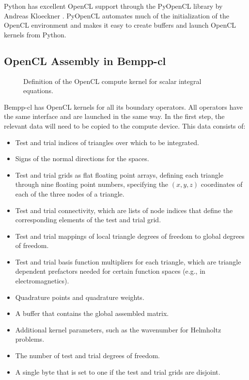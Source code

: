 Python has excellent OpenCL support through the PyOpenCL library by Andreas Kloeckner \cite{pyopencl}. PyOpenCL automates much of the initialization of the OpenCL environment and makes it easy to create buffers and launch OpenCL kernels from Python.

\subsection{OpenCL Assembly in Bempp-cl}

\begin{figure*}
	\center
	
	\caption{Definition of the OpenCL compute kernel for scalar integral equations.}
	\label{fig:kernel_definition}
\end{figure*}

Bempp-cl has OpenCL kernels for all its boundary operators. All operators have the same interface and are launched in the same way. In the first step, the relevant data will need to be copied to the compute device. This data consists of:

\begin{itemize}
	\item Test and trial indices of triangles over which to be integrated.
	\item Signs of the normal directions for the spaces.
	\item Test and trial grids as flat floating point arrays, defining each triangle through nine floating point numbers, specifying the $(x, y, z)$ coordinates of each of the three nodes of a triangle.
	\item Test and trial connectivity, which are lists of node indices that define the corresponding elements of the test and trial grid.
	\item Test and trial mappings of local triangle degrees of freedom to global degrees of freedom.
	\item Test and trial basis function multipliers for each triangle, which are triangle dependent prefactors needed for certain function spaces (e.g., in electromagnetics).
	\item Quadrature points and quadrature weights.
	\item A buffer that contains the global assembled matrix.
	\item Additional kernel parameters, such as the wavenumber for Helmholtz problems.
	\item The number of test and trial degrees of freedom.
	\item A single byte that is set to one if the test and trial grids are disjoint.
\end{itemize}

